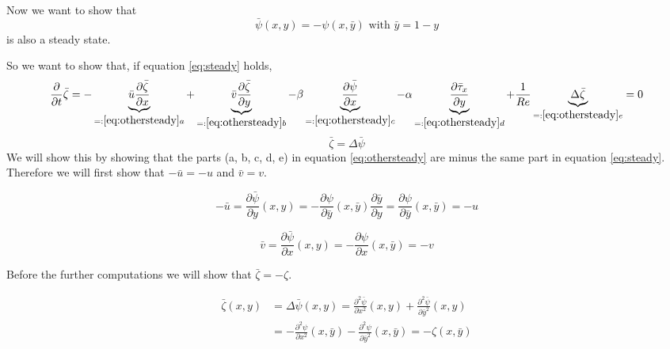 Now we want to show that 
$$\bar{\psi}(x,y)=-\psi(x,\bar{y}) \text{ with }\bar{y}=1-y$$
is also a steady state.

So we want to show that, if equation \ref{eq:steady} holds, 
 \begin{equation} \frac{\partial}{\partial t}\bar{\zeta}=- \underbrace{  \bar u \frac{\partial\bar{\zeta}}{\partial x}}_{=:\ref{eq:othersteady} a} +\underbrace{ \bar v \frac{\partial\bar{\zeta}}{\partial y}}_{=:\ref{eq:othersteady}b} -\beta \underbrace{ \frac{\partial \bar{\psi}}{\partial x} }_{=:\ref{eq:othersteady}c} -\alpha  \underbrace{\frac{\partial \bar \tau_x}{\partial y}}_{=:\ref{eq:othersteady}d} + \frac{1}{Re} \underbrace{\Delta \bar{\zeta}}_{=:\ref{eq:othersteady}e}=0 \label{eq:othersteady}
 \end{equation}
 $$\bar{\zeta}=\Delta \bar{\psi}$$ 
We will show this by showing that the parts (a, b, c, d, e) in equation \ref{eq:othersteady} are minus the same part in equation \ref{eq:steady}. Therefore we will first show that $-\bar{u}=-u$ and $\bar{v}=v$. 
 
\begin{equation}
-\bar u=\frac{\partial \bar{\psi}}{\partial y}(x,y)=-\frac{\partial \psi}{\partial \bar y}(x,\bar y)\frac{\partial \bar{y}}{\partial y}=\frac{\partial \psi}{\partial \bar y}(x,\bar y)=-u
\label{eq:ubar}
\end{equation}

\begin{equation}
\bar v=\frac{\partial \bar{\psi}}{\partial x}(x,y)=-\frac{\partial \psi}{\partial x}(x,\bar y)=-v \label{eq:vbar}
\end{equation}

Before the further computations we will show that $\bar{\zeta}=-\zeta$.

\begin{align}
\bar{\zeta}(x,y) &= \Delta \bar{\psi}(x,y)
=\frac{\partial^2\bar{\psi}}{\partial x^2}(x, y)+\frac{\partial^2\bar{\psi}}{\partial \bar y^2}(x, y) \nonumber \\
&=-\frac{\partial^2\psi}{\partial x^2}(x,\bar y)-\frac{\partial^2\psi}{\partial \bar y^2}(x,\bar y)
=-\zeta(x,\bar y)\label{eq:zetabar}
\end{align}

